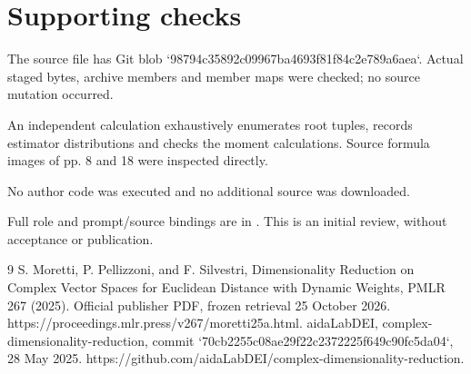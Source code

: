 \documentclass[10pt]{article}
\begin{document}
\section*{Supporting checks}
The source file has Git blob `98794c35892c09967ba4693f81f84c2e789a6aea`. Actual staged bytes, archive members and member maps were checked; no source mutation occurred.\par
An independent calculation exhaustively enumerates root tuples, records estimator distributions and checks the moment calculations. Source formula images of pp. 8 and 18 were inspected directly.\par
No author code was executed and no additional source was downloaded.\par
Full role and prompt/source bindings are in . This is an initial review, without acceptance or publication.\par
9 S. Moretti, P. Pellizzoni, and F. Silvestri, Dimensionality Reduction on Complex Vector Spaces for Euclidean Distance with Dynamic Weights, PMLR 267 (2025). Official publisher PDF, frozen retrieval 25 October 2026. https://proceedings.mlr.press/v267/moretti25a.html. aidaLabDEI, complex-dimensionality-reduction, commit `70cb2255c08ae29f22c2372225f649c90fc5da04`, 28 May 2025. https://github.com/aidaLabDEI/complex-dimensionality-reduction.\par
\end{document}

